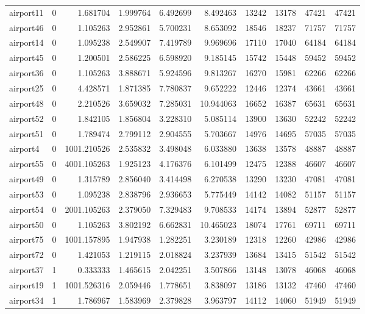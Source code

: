 \begin{longtable}{|l|r|r|r|r|r|r|r|r|r|}
airport11 & 0 & 1.681704 & 1.999764 & 6.492699 & 8.492463 & 13242 & 13178 & 47421 & 47421 \\
airport46 & 0 & 1.105263 & 2.952861 & 5.700231 & 8.653092 & 18546 & 18237 & 71757 & 71757 \\
airport14 & 0 & 1.095238 & 2.549907 & 7.419789 & 9.969696 & 17110 & 17040 & 64184 & 64184 \\
airport45 & 0 & 1.200501 & 2.586225 & 6.598920 & 9.185145 & 15742 & 15448 & 59452 & 59452 \\
airport36 & 0 & 1.105263 & 3.888671 & 5.924596 & 9.813267 & 16270 & 15981 & 62266 & 62266 \\
airport25 & 0 & 4.428571 & 1.871385 & 7.780837 & 9.652222 & 12446 & 12374 & 43661 & 43661 \\
airport48 & 0 & 2.210526 & 3.659032 & 7.285031 & 10.944063 & 16652 & 16387 & 65631 & 65631 \\
airport52 & 0 & 1.842105 & 1.856804 & 3.228310 & 5.085114 & 13900 & 13630 & 52242 & 52242 \\
airport51 & 0 & 1.789474 & 2.799112 & 2.904555 & 5.703667 & 14976 & 14695 & 57035 & 57035 \\
airport4 & 0 & 1001.210526 & 2.535832 & 3.498048 & 6.033880 & 13638 & 13578 & 48887 & 48887 \\
airport55 & 0 & 4001.105263 & 1.925123 & 4.176376 & 6.101499 & 12475 & 12388 & 46607 & 46607 \\
airport49 & 0 & 1.315789 & 2.856040 & 3.414498 & 6.270538 & 13290 & 13230 & 47081 & 47081 \\
airport53 & 0 & 1.095238 & 2.838796 & 2.936653 & 5.775449 & 14142 & 14082 & 51157 & 51157 \\
airport54 & 0 & 2001.105263 & 2.379050 & 7.329483 & 9.708533 & 14174 & 13894 & 52877 & 52877 \\
airport50 & 0 & 1.105263 & 3.802192 & 6.662831 & 10.465023 & 18074 & 17761 & 69711 & 69711 \\
airport75 & 0 & 1001.157895 & 1.947938 & 1.282251 & 3.230189 & 12318 & 12260 & 42986 & 42986 \\
airport72 & 0 & 1.421053 & 1.219115 & 2.018824 & 3.237939 & 13684 & 13415 & 51542 & 51542 \\
airport37 & 1 & 0.333333 & 1.465615 & 2.042251 & 3.507866 & 13148 & 13078 & 46068 & 46068 \\
airport19 & 1 & 1001.526316 & 2.059446 & 1.778651 & 3.838097 & 13186 & 13132 & 47460 & 47460 \\
airport34 & 1 & 1.786967 & 1.583969 & 2.379828 & 3.963797 & 14112 & 14060 & 51949 & 51949 \\

\end{longtable}
